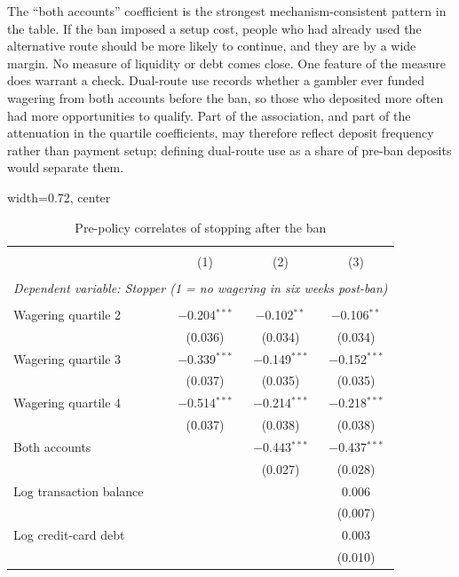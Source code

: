 \documentclass[12pt]{article}
\begin{document}
The ``both accounts'' coefficient is the strongest mechanism-consistent pattern in the table. If the ban imposed a setup cost, people who had already used the alternative route should be more likely to continue, and they are by a wide margin. No measure of liquidity or debt comes close. One feature of the measure does warrant a check. Dual-route use records whether a gambler ever funded wagering from both accounts before the ban, so those who deposited more often had more opportunities to qualify. Part of the association, and part of the attenuation in the quartile coefficients, may therefore reflect deposit frequency rather than payment setup; defining dual-route use as a share of pre-ban deposits would separate them.

\begin{table}[!htbp]
\centering
\caption{Pre-policy correlates of stopping after the ban}
\label{tab:stoppers}
\begin{adjustbox}{width=0.72\textwidth, center}
\begin{threeparttable}
\scriptsize
\begin{tabular}{@{\extracolsep{5pt}}lccc}
\\[-1.8ex]\hline
\hline \\[-1.8ex]
 & (1) & (2) & (3) \\
\hline \\[-1.8ex]
\multicolumn{4}{l}{\textit{Dependent variable: Stopper (1 = no wagering in six weeks post-ban)}} \\
\hline \\[-1.8ex]
Wagering quartile 2  & $-$0.204$^{***}$ & $-$0.102$^{**}$ & $-$0.106$^{**}$ \\
 & (0.036) & (0.034) & (0.034) \\[0.4em]
Wagering quartile 3 & $-$0.339$^{***}$ & $-$0.149$^{***}$ & $-$0.152$^{***}$ \\
 & (0.037) & (0.035) & (0.035) \\[0.4em]
Wagering quartile 4 & $-$0.514$^{***}$ & $-$0.214$^{***}$ & $-$0.218$^{***}$ \\
 & (0.037) & (0.038) & (0.038) \\[0.4em]
Both accounts &  & $-$0.443$^{***}$ & $-$0.437$^{***}$ \\
 &  & (0.027) & (0.028) \\[0.4em]
Log transaction balance &  &  & 0.006 \\
 &  &  & (0.007) \\[0.4em]
Log credit-card debt &  &  & 0.003 \\
 &  &  & (0.010) \\[0.4em]

\end{tabular}
\end{threeparttable}
\end{adjustbox}
\end{table}
\end{document}
